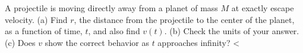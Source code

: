         A projectile is moving directly away from a planet of mass $M$ at exactly
        escape velocity. (a) Find $r$, the distance from the projectile to the center
        of the planet, as a function of time, $t$, and also find $v(t)$.\answercheck\hwendpart
        (b) Check the units of your answer.\hwendpart
        (c) Does $v$ show the correct behavior as $t$ approaches infinity?
        <%
